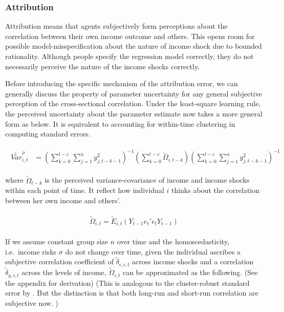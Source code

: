 \documentclass[12pt,notitlepage,onecolumn,aps,pra]{article}
\begin{document}
    \hypertarget{attribution}{%
\subsubsection{Attribution}\label{attribution}}

Attribution means that agents subjectively form perceptions about the
correlation between their own income outcome and others. This opens room
for possible model-misspecification about the nature of income shock due
to bounded rationality. Although people specify the regression model
correctly, they do not necessarily perceive the nature of the income
shocks correctly.

Before introducing the specific mechanism of the attribution error, we
can generally discuss the property of parameter uncertainty for any
general subjective perception of the cross-sectional correlation. Under
the least-square learning rule, the perceived uncertainty about the
parameter estimate now takes a more general form as below. It is
equivalent to accounting for within-time clustering in computing
standard errors.

\begin{eqnarray}
\begin{split}
\tilde {Var}^{\rho}_{i,t} & =   (\sum^{t-c}_{k=0}\sum^{n}_{j=1}y^2_{j,t-k-1})^{-1}(\sum^{t-c}_{k=0}\tilde \Omega_{i,t-k})(\sum^{t-c}_{k=0}\sum^{n}_{j=1}y^2_{j,t-k-1})^{-1}
\end{split}
\end{eqnarray}

where \(\tilde \Omega_{t-k}\) is the perceived variance-covariance of
income and income shocks within each point of time. It reflect how
individual \(i\) thinks about the correlation between her own income and
others'.

\begin{eqnarray}
\begin{split}
\tilde \Omega_{i,t} = \tilde E_{i,t}(Y_{t-1}e_{t}'e_{t}Y_{t-1})
\end{split}
\end{eqnarray}

If we assume constant group size \(n\) over time and the
homoscedasticity, i.e.~income risks \(\sigma\) do not change over time,
given the individual ascribes a subjective correlation coefficient of
\(\tilde \delta_{\epsilon, i,t}\) across income shocks and a correlation
\(\tilde \delta_{y, i,t}\) across the levels of income,
\(\tilde \Omega_{i,t}\) can be approximated as the following. (See the
appendix for derivation) (This is analogous to the cluster-robust
standard error by \cite{cameron2011robust}. But the distinction is that
both long-run and short-run correlation are subjective now. )
\end{document}
